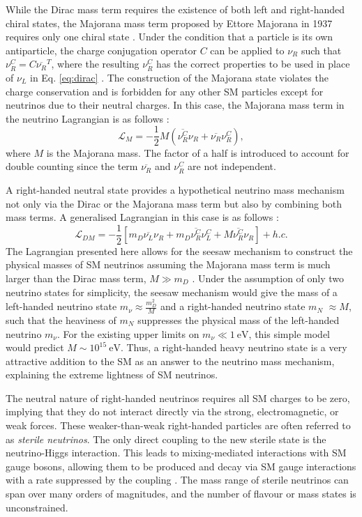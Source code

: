While the Dirac mass term requires the existence of both left and right-handed chiral states, the Majorana mass term proposed by Ettore Majorana in 1937 requires only one chiral state \cite{Majorana}.
Under the condition that a particle is its own antiparticle, the charge conjugation operator $C$ can be applied to $\nu_R$ such that $\nu^{C}_{R}=C\overline{\nu_{R}}^{T}$, where the resulting $\nu_R^C$ has the correct properties to be used in place of $\nu_L$ in Eq. \ref{eq:dirac} \cite{Kim}.
The construction of the Majorana state violates the charge conservation and is forbidden for any other SM particles except for neutrinos due to their neutral charges. 
In this case, the Majorana mass term in the neutrino Lagrangian is as follows \cite{Kim}:
\begin{equation}
	\mathcal{L}_{M} = -\frac{1}{2}M\left(\overline{\nu_{R}^{C}}\nu_{R} + \overline{\nu_{R}}\nu_{R}^{C}\right),
\end{equation}
where $M$ is the Majorana mass. 
The factor of a half is introduced to account for double counting since the term $\overline{\nu_R}$ and $\nu^C_R$ are not independent.

A right-handed neutral state provides a hypothetical neutrino mass mechanism not only via the Dirac or the Majorana mass term but also by combining both mass terms.
A generalised Lagrangian in this case is as follows \cite{Thomson}:
\begin{equation}
        \mathcal{L}_{DM} = -\frac{1}{2}\left[m_D\overline{\nu_{L}}\nu_{R} + m_D\overline{\nu_{R}^{C}}\nu_{L}^C + M\overline{\nu_{R}^{C}}\nu_{R}\right] + h.c.
\end{equation}
The Lagrangian presented here allows for the seesaw mechanism to construct the physical masses of SM neutrinos assuming the Majorana mass term is much larger than the Dirac mass term, $M \gg m_D$ \cite{Thomson, nuMass}.
Under the assumption of only two neutrino states for simplicity, the seesaw mechanism would give the mass of a left-handed neutrino state $m_{\nu} \approx \frac{m_D^2}{M}$ and a right-handed neutrino state $m_N$ $\approx M$, such that the heaviness of $m_N$ suppresses the physical mass of the left-handed neutrino $m_\nu$.
For the existing upper limits on $m_\nu \ll 1~\mathrm{eV}$, this simple model would predict $M \sim 10^{15}~\mathrm{eV}$.
Thus, a right-handed heavy neutrino state is a very attractive addition to the SM as an answer to the neutrino mass mechanism, explaining the extreme lightness of SM neutrinos.

The neutral nature of right-handed neutrinos requires all SM charges to be zero, implying that they do not interact directly via the strong, electromagnetic, or weak forces.
These weaker-than-weak right-handed particles are often referred to as \textit{sterile neutrinos}.
The only direct coupling to the new sterile state is the neutrino-Higgs interaction.
This leads to mixing-mediated interactions with SM gauge bosons, allowing them to be produced and decay via SM gauge interactions with a rate suppressed by the coupling \cite{SBNHNL}.
The mass range of sterile neutrinos can span over many orders of magnitudes, and the number of flavour or mass states is unconstrained.

